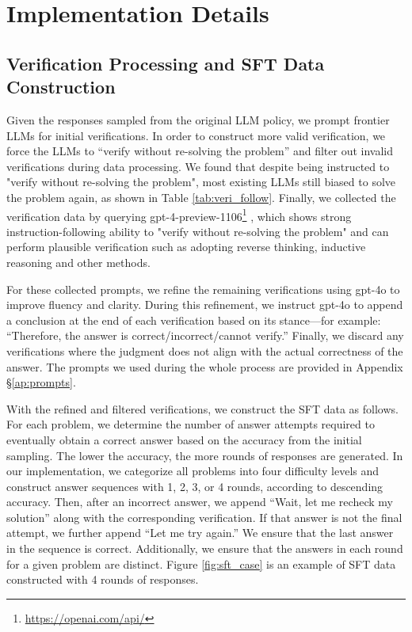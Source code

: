 \section{Implementation Details}
\subsection{Verification Processing and SFT Data Construction}
\label{ap:veri_implement}
Given the responses sampled from the original LLM policy, we prompt frontier LLMs for initial verifications. In order to construct more valid verification, we force the LLMs to ``verify without re-solving the problem'' and filter out invalid verifications during data processing. We found that despite being instructed to "verify without re-solving the problem", most existing LLMs still biased to solve the problem again, as shown in Table \ref{tab:veri_follow}. Finally, we collected the verification data by querying gpt-4-preview-1106\footnote{\url{https://openai.com/api/}}
, which shows strong instruction-following ability to "verify without re-solving the problem" and can perform plausible verification such as adopting reverse thinking, inductive reasoning and other methods.


For these collected prompts, we refine the remaining verifications using gpt-4o to improve fluency and clarity. During this refinement, we instruct gpt-4o to append a conclusion at the end of each verification based on its stance—for example: ``Therefore, the answer is correct/incorrect/cannot verify.'' Finally, we discard any verifications where the judgment does not align with the actual correctness of the answer. The prompts we used during the whole process are provided in Appendix \S\ref{ap:prompts}.

With the refined and filtered verifications, we construct the SFT data as follows. For each problem, we determine the number of answer attempts required to eventually obtain a correct answer based on the accuracy from the initial sampling. The lower the accuracy, the more rounds of responses are generated. In our implementation, we categorize all problems into four difficulty levels and construct answer sequences with 1, 2, 3, or 4 rounds, according to descending accuracy. Then, after an incorrect answer, we append ``Wait, let me recheck my solution'' along with the corresponding verification. If that answer is not the final attempt, we further append ``Let me try again.'' We ensure that the last answer in the sequence is correct. Additionally, we ensure that the answers in each round for a given problem are distinct. Figure \ref{fig:sft_case} is an example of SFT data constructed with 4 rounds of responses.

